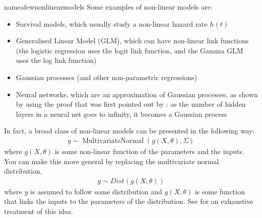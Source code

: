 \begin{answer}{nameafewnonlinearmodels}
Some examples of non-linear models are:
\begin{itemize}
  \item Survival models, which usually study a non-linear hazard rate $h(t)$
  \item Generalised Linear Model (GLM), which can have non-linear link functions
  (the logistic regression uses the logit link function, and the Gamma GLM uses the log link function)
  \item Gaussian processes (and other non-parametric regressions)
  \item Neural networks, which are an approximation of Gaussian processes, as shown by \citet[chap.~15.4]{murphy2012machine} using the proof that was first pointed out by  \citet{neal1996bayesian}: as the number of hidden layers in a neural net goes to infinity, it becomes a Gaussian process
\end{itemize}
In fact, a broad class of non-linear models can be presented in the following way:
\begin{align*}
  y \sim
  \operatorname{MultivariateNormal}( g(X,\theta), \Sigma )
\end{align*}
where $g(X,\theta)$ is some non-linear function of the parameters and the inputs.
You can make this more general by replacing the multivariate normal distribution,
\begin{align*}
  y \sim Dist( g(X,\theta) )
\end{align*}
where $y$ is assumed to follow some distribution and $g(X, \theta)$ is some function that links the inputs to the parameters of the distribution.
See \citet{murphy2012machine} for an exhaustive treatment of this idea.

\end{answer}
